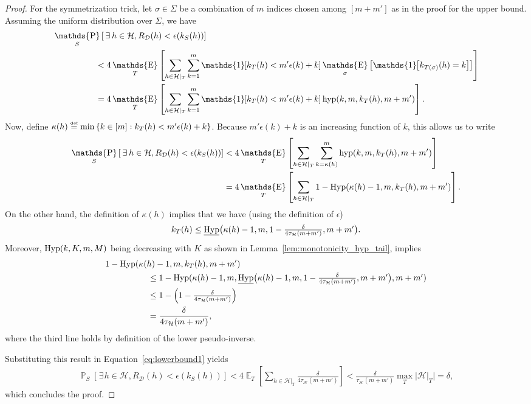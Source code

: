 \documentclass[twoside,11pt]{article}
\newcommand{\Id}[1]{\mathds{1}\hspace{-2.5pt}\left[#1\right]}
\let\oldexists=\exists
\renewcommand{\exists}{\hspace{1pt}\oldexists\hspace{1pt}}
\newcommand{\pr}[1]{\left(#1\right)}
\newcommand{\cb}[1]{\left\{#1\right\}}
\newcommand{\D}{\mathcal{D}}
\renewcommand{\H}{{\mathcal{H}}}
\newcommand{\eqdef}{\overset{\smash{\mbox{\tiny \rm def}}}{=}}
\DeclareMathOperator*{\Prob}{\mathds{P}}
\newcommand{\prob}[2]{\Prob_{#1}\left[#2\right]}
\DeclareMathOperator*{\Expectation}{\mathds{E}}
\newcommand{\exv}[2]{\Expectation_{#1}\left[#2\right]}
\newcommand{\hyp}{\textnormal{hyp}}
\newcommand{\Hyp}{\textnormal{Hyp}}
\newcommand{\HypInvLower}{\underline{\textnormal{Hyp}}}
\begin{document}
\begin{proof}
For the symmetrization trick, let $\sigma \in \Sigma$ be a combination of $m$ indices chosen among $[m+m']$ as in the proof for the upper bound.
Assuming the uniform distribution over $\Sigma$, we have
\begin{align*}
&\prob{S}{\exists h \in \H, R_\D(h) < \epsilon(k_S(h))}\\
&\hspace{50pt}< 4 \exv{T}{\sum_{h\in\H|_T} \sum_{k=1}^m \Id{k_{T}(h) < m'\epsilon(k) +k } \exv{\sigma}{\Id{k_{T(\sigma)}(h) = k}} }\\
&\hspace{50pt}= 4 \exv{T}{\sum_{h\in\H|_T} \sum_{k=1}^m \Id{k_{T}(h) < m'\epsilon(k) +k } \hyp(k,m,k_T(h),m+m')}.
\end{align*}
Now, define $\kappa(h) \eqdef \min \cb{ k \in [m] : k_{T}(h) < m'\epsilon(k) +k }$.
Because $m'\epsilon(k)+k$ is an increasing function of $k$, this allows us to write
\begin{align}
\prob{S}{\exists h \in \H, R_\D(h) < \epsilon(k_S(h))}\nonumber
&< 4 \exv{T}{\sum_{h\in\H|_T} \sum_{k=\kappa(h)}^m \hyp(k,m,k_T(h),m+m')}\\
&= 4 \exv{T}{\sum_{h\in\H|_T} 1 - \Hyp(\kappa(h)-1,m,k_T(h), m+m')}.\label{eq:lowerbound1}
\end{align}
On the other hand, the definition of $\kappa(h)$ implies that we have (using the definition of $\epsilon$)
\begin{equation*}
k_T(h) \le \HypInvLower\big(\kappa(h)-1, m, \textstyle 1-\frac{\delta}{4 \tau_\H(m+m')}, m+m'\big).
\end{equation*}
Moreover, $\Hyp(k, K, m, M)$ being decreasing with $K$ as shown in Lemma~\ref{lem:monotonicity_hyp_tail}, implies
\begin{align*}
    &1 - \Hyp(\kappa(h)-1, m, k_T(h), m+m')\\
    &\hspace{50pt}\le 1 - \Hyp(\kappa(h)-1, m, \HypInvLower\big(\kappa(h)-1, m, \textstyle 1-\frac{\delta}{4 \tau_\H(m+m')}, m+m'\big), m+m')\\
    &\hspace{50pt}\le 1 - \pr{\textstyle 1-\frac{\delta}{4 \tau_\H(m+m')}}\\
    &\hspace{50pt}= \frac{\delta}{4 \tau_\H(m+m')},
\end{align*}
where the third line holds by definition of the lower pseudo-inverse.

Substituting this result in Equation~\eqref{eq:lowerbound1} yields
\begin{align*}
\prob{S}{\exists h \in \H, R_\D(h) < \epsilon(k_S(h))}
< 4 \exv{T}{\sum_{h\in\H|_T} \frac{\delta}{4 \tau_\H(m+m')}}
< \frac{\delta}{\tau_\H(m+m')} \max_T \Big|\H|_T\Big|
= \delta,
\end{align*}
which concludes the proof.
\end{proof}
\end{document}
